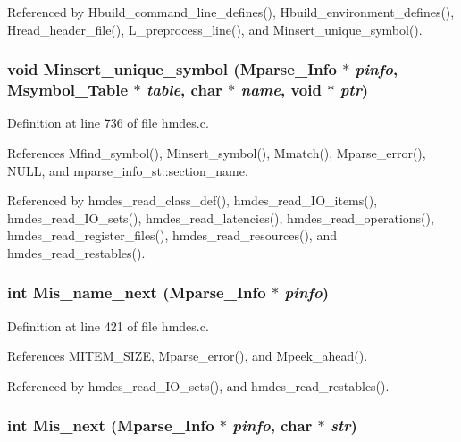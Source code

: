 Referenced by Hbuild\_\-command\_\-line\_\-defines(), Hbuild\_\-environment\_\-defines(), Hread\_\-header\_\-file(), L\_\-preprocess\_\-line(), and Minsert\_\-unique\_\-symbol().
\subsubsection{\setlength{\rightskip}{0pt plus 5cm}void Minsert\_\-unique\_\-symbol (\bf{Mparse\_\-Info} $\ast$ {\em pinfo}, \bf{Msymbol\_\-Table} $\ast$ {\em table}, char $\ast$ {\em name}, void $\ast$ {\em ptr})}\label{hmdes_8c_5ac6a523a50fd5a52219a1820c8ea6ad}




Definition at line 736 of file hmdes.c.

References Mfind\_\-symbol(), Minsert\_\-symbol(), Mmatch(), Mparse\_\-error(), NULL, and mparse\_\-info\_\-st::section\_\-name.

Referenced by hmdes\_\-read\_\-class\_\-def(), hmdes\_\-read\_\-IO\_\-items(), hmdes\_\-read\_\-IO\_\-sets(), hmdes\_\-read\_\-latencies(), hmdes\_\-read\_\-operations(), hmdes\_\-read\_\-register\_\-files(), hmdes\_\-read\_\-resources(), and hmdes\_\-read\_\-restables().
\subsubsection{\setlength{\rightskip}{0pt plus 5cm}int Mis\_\-name\_\-next (\bf{Mparse\_\-Info} $\ast$ {\em pinfo})}\label{hmdes_8c_7040d7057210a1a7921077362a420f82}




Definition at line 421 of file hmdes.c.

References MITEM\_\-SIZE, Mparse\_\-error(), and Mpeek\_\-ahead().

Referenced by hmdes\_\-read\_\-IO\_\-sets(), and hmdes\_\-read\_\-restables().
\subsubsection{\setlength{\rightskip}{0pt plus 5cm}int Mis\_\-next (\bf{Mparse\_\-Info} $\ast$ {\em pinfo}, char $\ast$ {\em str})}\label{hmdes_8c_8233d14a6a48cff6d2bd467a11583d87}




